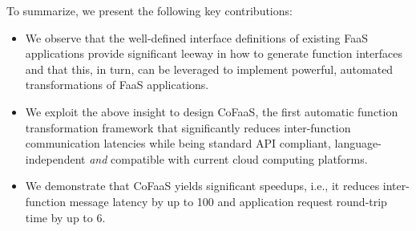 To summarize, we present the following key contributions:
\begin{itemize}

\item We observe that the well-defined interface definitions of existing FaaS applications provide significant leeway in how to generate function interfaces and that this, in turn, can be leveraged to implement powerful, automated transformations of FaaS applications.

\item We exploit the above insight to design CoFaaS, the first automatic function transformation framework that significantly reduces inter-function communication latencies while being standard API compliant, language-independent {\it and} compatible with current cloud computing platforms.

\item We demonstrate that CoFaaS yields significant speed\-ups, i.e., it reduces inter-function message latency by up to 100\texttimes{} and application request round-trip time by up to 6\texttimes{}.
\end{itemize}






